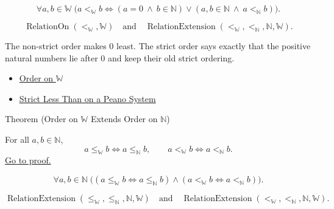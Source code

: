 \begin{remark*}
\[
\forall a,b\in\mathbb{W}\;
\bigl(a<_{\mathbb{W}}b
\Longleftrightarrow
(a=0\ \wedge\ b\in\mathbb{N})
\vee
(a,b\in\mathbb{N}\ \wedge\ a<_{\mathbb{N}}b)\bigr).
\]
\end{remark*}

\begin{remark*}
\[
\operatorname{RelationOn}(<_{\mathbb{W}},\mathbb{W})
\quad\text{and}\quad
\operatorname{RelationExtension}
(<_{\mathbb{W}},<_{\mathbb{N}},\mathbb{N},\mathbb{W}).
\]
\end{remark*}

\begin{remark*}[Interpretation]
The non-strict order makes $0$ least. The strict order says exactly that the
positive natural numbers lie after $0$ and keep their old strict ordering.
\end{remark*}

\begin{dependencies}
\begin{itemize}
  \item \hyperref[def:order-on-w]{Order on $\mathbb{W}$}
  \item \hyperref[def:strict-less-than-on-peano-system]{Strict Less Than on a Peano System}
\end{itemize}
\end{dependencies}

\begin{theorembox}{Theorem (Order on \texorpdfstring{$\mathbb{W}$}{W} Extends Order on \texorpdfstring{$\mathbb{N}$}{N})}
\begin{theorem}
\label{thm:order-on-w-extends-order-on-n}
For all $a,b\in\mathbb{N}$,
\[
a\leq_{\mathbb{W}}b\Longleftrightarrow a\leq_{\mathbb{N}}b,
\qquad
a<_{\mathbb{W}}b\Longleftrightarrow a<_{\mathbb{N}}b.
\]
\hyperref[prf:order-on-w-extends-order-on-n]{Go to proof.}
\end{theorem}
\end{theorembox}

\begin{remark*}
\[
\forall a,b\in\mathbb{N}\;
\bigl(
(a\leq_{\mathbb{W}}b\Longleftrightarrow a\leq_{\mathbb{N}}b)
\wedge
(a<_{\mathbb{W}}b\Longleftrightarrow a<_{\mathbb{N}}b)
\bigr).
\]
\end{remark*}

\begin{remark*}
\[
\operatorname{RelationExtension}
(\leq_{\mathbb{W}},\leq_{\mathbb{N}},\mathbb{N},\mathbb{W})
\quad\text{and}\quad
\operatorname{RelationExtension}
(<_{\mathbb{W}},<_{\mathbb{N}},\mathbb{N},\mathbb{W}).
\]
\end{remark*}

